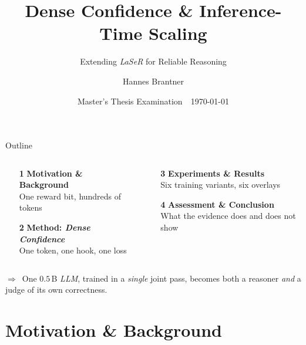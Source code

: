 \documentclass[aspectratio=169,10pt,t]{beamer}
\title{Dense Confidence \& Inference-Time Scaling}
\subtitle{Extending \textit{LaSeR} for Reliable \acit{LLM} Reasoning}
\author{Hannes Brantner}
\institute{Institute for Machine Learning, Johannes Kepler University Linz}
\date{Master's Thesis Examination\ \textbar\ \today}
\DeclareRobustCommand{\acit}[1]{\textit{\acs{#1}}}
\newcommand{\takeaway}[1]{%
	\vfill
	\setlength{\fboxsep}{4pt}%
	\noindent\colorbox{jkulight}{%
		\begin{minipage}{\dimexpr\textwidth-2\fboxsep\relax}%
			\footnotesize\raggedright\color{jkunavy}%
			\textcolor{jkumagenta}{\textbf{$\Rightarrow$}}~#1%
		\end{minipage}}%
	\vspace{1pt}%
}
\newcommand{\nv}[1]{\textcolor{jkunavy}{\textbf{#1}}}
\begin{document}


\begin{frame}
	\titlepage
\end{frame}

\begin{frame}{Outline}
	\vspace{0.25cm}
	\begin{columns}[T, onlytextwidth]
		\begin{column}{0.49\textwidth}
			\begin{enumerate}
				\setlength{\itemsep}{10pt}
				\item[\textcolor{jkublue}{\bfseries 1}] \nv{Motivation \& Background} \\
				      {\small\color{jkugrey} One reward bit, hundreds of tokens}
				\item[\textcolor{jkublue}{\bfseries 2}] \nv{Method: \textit{Dense Confidence}} \\
				      {\small\color{jkugrey} One token, one hook, one loss}
			\end{enumerate}
		\end{column}
		\begin{column}{0.49\textwidth}
			\begin{enumerate}
				\setlength{\itemsep}{10pt}
				\item[\textcolor{jkublue}{\bfseries 3}] \nv{Experiments \& Results} \\
				      {\small\color{jkugrey} Six training variants, six overlays}
				\item[\textcolor{jkublue}{\bfseries 4}] \nv{Assessment \& Conclusion} \\
				      {\small\color{jkugrey} What the evidence does and does not show}
			\end{enumerate}
		\end{column}
	\end{columns}
	\takeaway{One $0.5\,$B \acit{LLM}, trained in a \emph{single} joint pass, becomes both a reasoner \emph{and} a judge of its own correctness.}
\end{frame}

\section{Motivation \& Background}
\end{document}
